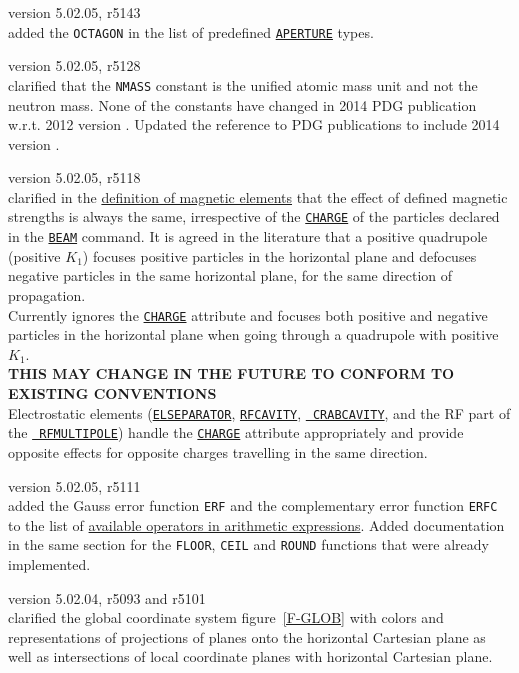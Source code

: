 \begin{madlist}
   version 5.02.05, r5143\\
  added the {\tt OCTAGON} in the list of predefined 
  \hyperref[chap:aperture]{\tt APERTURE} types.
  
   version 5.02.05, r5128\\
  clarified that the {\tt NMASS} constant is the unified atomic mass 
  unit and not the neutron mass. None of the constants have changed in 2014 PDG 
  publication w.r.t. 2012 version \cite{PDG2012}. Updated the reference to PDG 
  publications to include 2014 version \cite{PDG2014}.

   version 5.02.05, r5118\\
  clarified in the \hyperref[chap:elements]{definition of magnetic elements} 
  that the effect of defined magnetic strengths is always the same, 
  irrespective of the \hyperref[sec:beam]{\tt CHARGE} of the particles declared 
  in the \hyperref[sec:beam]{\tt BEAM} command. It is agreed in the literature 
  that a positive quadrupole (positive $K_1$) focuses positive particles in the 
  horizontal plane and defocuses negative particles in the same horizontal 
  plane, for the same direction of propagation. \\ 
  Currently \mad ignores the \hyperref[sec:beam]{\tt CHARGE} attribute and 
  focuses both positive and negative particles in the horizontal plane when 
  going through a quadrupole with positive $K_1$. \\
  {\bf THIS MAY CHANGE IN THE FUTURE TO CONFORM TO EXISTING CONVENTIONS}\\
  Electrostatic elements (\hyperref[sec:elseparator]{\tt ELSEPARATOR}, 
  \hyperref[sec:rfcavity]{\tt RFCAVITY}, \hyperref[sec:crabcavity]{\tt 
  CRABCAVITY}, and the RF part of the \hyperref[sec:rfmultipole]{\tt 
  RFMULTIPOLE}) handle the \hyperref[sec:beam]{\tt CHARGE} attribute 
  appropriately and provide 
  opposite effects for opposite charges travelling in the same direction. 


   version 5.02.05, r5111\\
  added the Gauss error function {\tt ERF} and the complementary error function 
  {\tt ERFC} to the list of \hyperref[subsec:operator]{available operators in 
  arithmetic expressions}. Added documentation in the same section for the 
  {\tt FLOOR}, {\tt CEIL} and {\tt ROUND} functions that were already 
  implemented. 
  
  
   version 5.02.04, r5093 and r5101\\
  clarified the global coordinate system figure~\ref{F-GLOB} with colors and 
  representations of projections of planes onto the horizontal Cartesian 
  plane as well as intersections of local coordinate planes with horizontal 
  Cartesian plane. 
  

\end{madlist}
